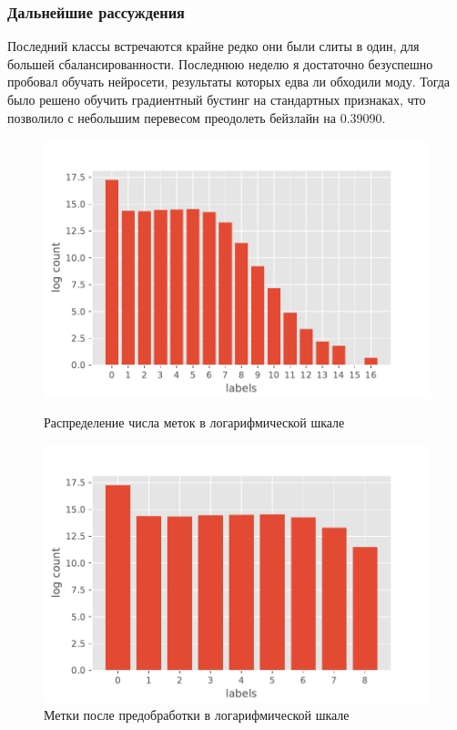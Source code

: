 \documentclass[russian, 10pt]{beamer}
\begin{document}
\begin{frame}
\frametitle{Дальнейшие рассуждения}

Последний классы встречаются крайне редко они были слиты в один, для большей сбалансированности. Последнюю неделю я достаточно безуспешно пробовал обучать нейросети, результаты которых едва ли обходили моду. Тогда было решено обучить градиентный бустинг на стандартных признаках, что позволило с небольшим перевесом преодолеть бейзлайн на 0.39090.

\begin{figure}[h!]
\begin{minipage}[h]{0.4\linewidth}
\centering
\includegraphics[scale=0.4]{images/label_distr_1.pdf}
\caption{Распределение числа меток в логарифмической шкале}
\end{minipage}
\hfill
\begin{minipage}[h]{0.5\linewidth}
\includegraphics[scale=0.4]{images/label_distr_2.pdf}
\caption{Метки после предобработки в логарифмической шкале}
\end{minipage}
\hfill
\end{figure}


\end{frame}
\end{document}
